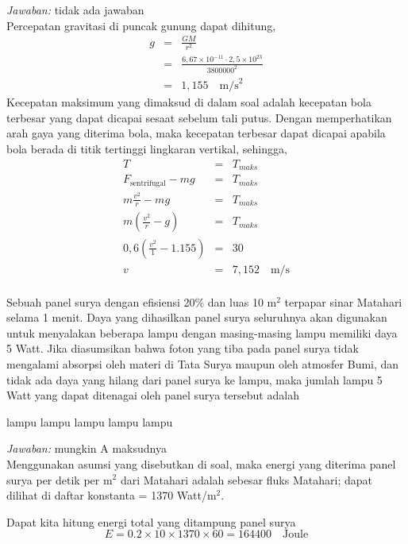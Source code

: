 \documentclass[11pt,fleqn]{exam}
\begin{document}
\begin{questions}
\textit{Jawaban: } tidak ada jawaban\\

Percepatan gravitasi di puncak gunung dapat dihitung,
\begin{eqnarray*}
g &=& \frac{GM}{r^2}\\
&=& \frac{6,67 \times 10^{-11} \cdot 2,5 \times 10^{23}}{3800000^2}\\
&=& 1,155 \quad \text{m/s}^2
\end{eqnarray*}
Kecepatan maksimum yang dimaksud di dalam soal adalah kecepatan bola terbesar yang dapat dicapai sesaat sebelum tali putus. Dengan memperhatikan arah gaya yang diterima bola, maka kecepatan terbesar dapat dicapai apabila bola berada di titik tertinggi lingkaran vertikal, sehingga,
\begin{eqnarray*}
T &=& T_{maks}\\
F_{\text{sentrifugal}} - mg &=& T_{maks}\\
m \frac{v^2}{r} - mg &=& T_{maks}\\
m (\frac{v^2}{r} - g) &=& T_{maks}\\
0,6 (\frac{v^2}{1} - 1.155) &=& 30\\
v &=& 7,152 \quad \text{m/s}\\
\end{eqnarray*}


\question Sebuah panel surya dengan efisiensi 20\% dan luas 10 m$^2$ terpapar sinar Matahari selama 1 menit. Daya yang dihasilkan panel surya seluruhnya akan digunakan untuk menyalakan beberapa lampu dengan masing-masing lampu memiliki daya 5 Watt. Jika diasumsikan bahwa foton yang tiba pada panel surya tidak mengalami absorpsi oleh materi di Tata Surya maupun oleh atmosfer Bumi, dan tidak ada daya yang hilang dari panel surya ke lampu, maka jumlah lampu 5 Watt yang dapat ditenagai oleh panel surya tersebut adalah
\begin{choices}
 lampu
 lampu
 lampu
 lampu
 lampu
\end{choices}

\textit{Jawaban: } mungkin A maksudnya\\

Menggunakan asumsi yang disebutkan di soal, maka energi yang diterima panel surya per detik per m$^2$ dari Matahari adalah sebesar fluks Matahari; dapat dilihat di daftar konstanta = 1370 Watt/m$^2$. 

Dapat kita hitung energi total yang ditampung panel surya
\begin{equation*}
E = 0.2 \times 10 \times 1370 \times 60 = 164400 \quad \text{Joule}
\end{equation*}


\end{questions}
\end{document}
